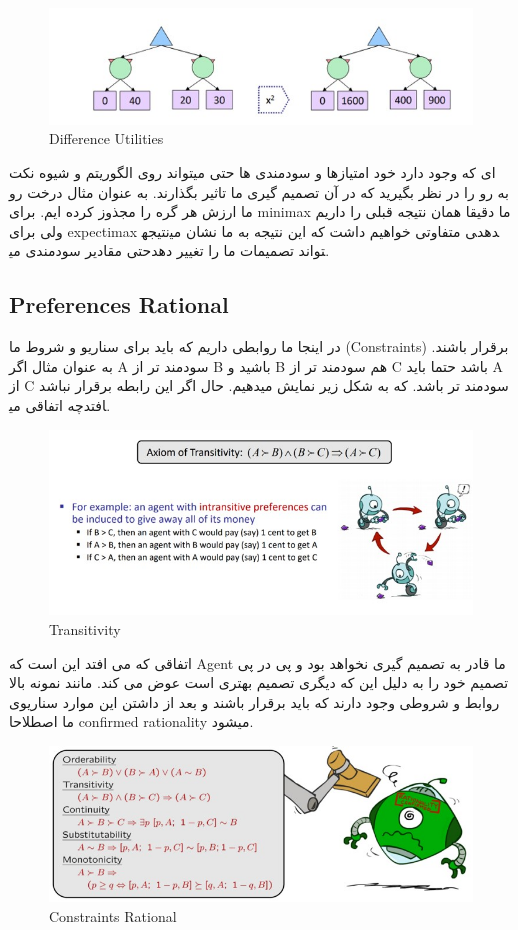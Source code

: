 \begin{figure}[h!]
    \centering
    \includegraphics[width=0.8\linewidth]{images/utilities01.jpg}
    \caption{Difference Utilities}
\end{figure}

نکت ‎ای که وجود دارد خود امتیازها و سودمندی ها حتی میتواند روی الگوریتم و شیوه تصمیم گیری ما تاثیر بگذارند. به عنوان مثال درخت رو‎ به رو را در نظر بگیرید که در آن ما ارزش هر گره را مجذوز کرده ایم. برای minimax ما دقیقا همان نتیجه قبلی را داریم ولی برای expectimax نتیجه‎ی متفاوتی خواهیم داشت که این نتیجه به ما نشان می‎دهد حتی مقادیر سودمندی می‎تواند تصمیمات ما را تغییر دهد.

\subsection{Preferences Rational}
در اینجا ما روابطی داریم که باید برای سناریو و شروط ما (Constraints) برقرار باشند. به عنوان مثال اگر A سودمند تر از B باشید و B هم سودمند تر از C باشد حتما باید A از C سودمند تر باشد. که به شکل زیر نمایش میدهیم. حال اگر این رابطه برقرار نباشد چه اتفاقی می‎افتد.

\begin{figure}[h!]
    \centering
    \includegraphics[width=0.8\linewidth]{images/transivity.jpg}
    \caption{Transitivity}
\end{figure}


اتفاقی که می افتد این است که Agent ما قادر به تصمیم گیری نخواهد بود و پی در پی تصمیم خود را به دلیل این که دیگری تصمیم بهتری است عوض می کند. مانند نمونه بالا روابط و شروطی وجود دارند که باید برقرار باشند و بعد از داشتن این موارد سناریوی ما اصطلاحا confirmed rationality میشود.

\begin{figure}[h!]
    \centering
    \includegraphics[width=0.8\linewidth]{images/rationality.jpg}
    \caption{Constraints Rational}
\end{figure}


